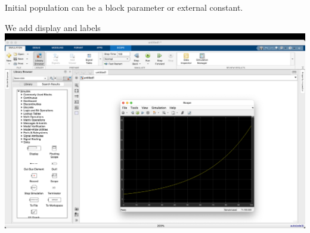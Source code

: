 \begin{frame}{\small Initial population can be a block parameter or external constant.}
    \hspace*{-11mm}
\end{frame}

\begin{frame}{We add display and labels}
    \hspace*{-11mm}
    \includegraphics[width=\paperwidth]{lesson_2/images/simulink_screen_26.png}
\end{frame}

